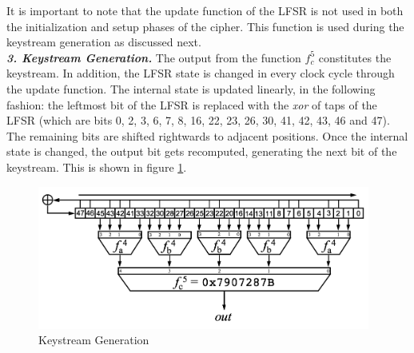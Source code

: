 It is important to note that the update function of the LFSR is not used in both the initialization and setup phases of the cipher. This function is used during the keystream generation as discussed next.\\



%

\noindent \textit{\textbf{3. Keystream Generation.}} The output from the function $f_c^5$ constitutes the keystream. In addition, the LFSR state is changed in every clock cycle through the update function. The internal state is updated linearly, in the following fashion: the leftmost bit of the LFSR is replaced with the \textit{xor} of taps of the LFSR (which are bits 0, 2, 3, 6, 7, 8, 16, 22, 23, 26, 30, 41, 42, 43, 46 and 47). The remaining bits are shifted rightwards to adjacent positions. Once the internal state is changed, the output bit gets recomputed, generating the next bit of the keystream. This is shown in figure \ref{fig:hitag2-3}. 

%

\begin{figure}[ht!]
	\centering
		\includegraphics[width=4.3in]{./figures/hitag2-3.PNG}
	\caption{Keystream Generation \cite{hitag2-figure}}	
	\label{fig:hitag2-3}
\end{figure}

